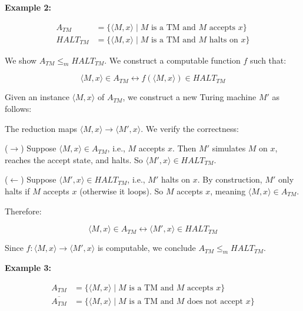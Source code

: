 \documentclass[12pt,a4paper,openany]{article}
\begin{document}
\textbf{Example 2:}

\begin{align*}
A_{TM} &= \{\langle M, x \rangle \mid M \text{ is a TM and } M \text{ accepts } x\} \\
HALT_{TM} &= \{\langle M, x \rangle \mid M \text{ is a TM and } M \text{ halts on } x\}
\end{align*}

We show $A_{TM} \leq_m HALT_{TM}$. We construct a computable function $f$ such that:

\[
\langle M, x\rangle \in A_{TM} \leftrightarrow f(\langle M, x\rangle) \in HALT_{TM}
\]

\noindent Given an instance $\langle M, x\rangle$ of $A_{TM}$, we construct a new Turing machine $M'$ as follows:

\bigskip

\begin{center}
\end{center}

The reduction maps $\langle M, x\rangle \to \langle M', x \rangle$. We verify the correctness:

($\to$) Suppose $\langle M, x\rangle \in A_{TM}$, i.e., $M$ accepts $x$. Then $M'$ simulates $M$ on $x$, reaches the accept state, and halts. So $\langle M', x \rangle \in HALT_{TM}$.

($\leftarrow$) Suppose $\langle M', x \rangle \in HALT_{TM}$, i.e., $M'$ halts on $x$. By construction, $M'$ only halts if $M$ accepts $x$ (otherwise it loops). So $M$ accepts $x$, meaning $\langle M, x\rangle \in A_{TM}$.

Therefore:

\[
\langle M, x\rangle \in A_{TM} \leftrightarrow \langle M', x \rangle \in HALT_{TM}
\]

Since $f : \langle M, x\rangle \to \langle M', x \rangle$ is computable, we conclude $A_{TM} \leq_m HALT_{TM}$.

\bigskip

\textbf{Example 3:}

\begin{align*}
A_{TM} &= \{\langle M, x \rangle \mid M \text{ is a TM and } M \text{ accepts } x\} \\
\overline{A_{TM}} &= \{\langle M, x \rangle \mid M \text{ is a TM and } M \text{ does not accept } x\}
\end{align*}
\end{document}
